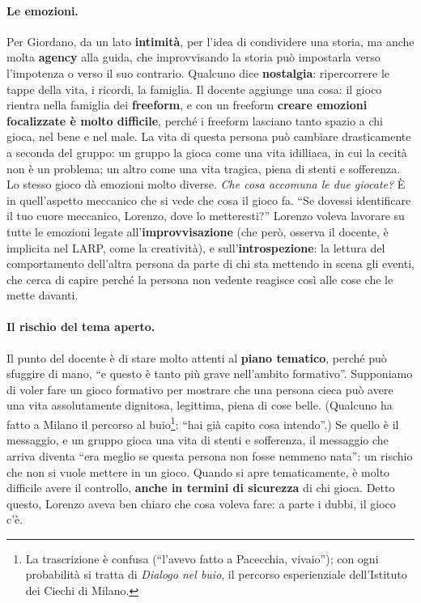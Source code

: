 \paragraph{Le emozioni.} Per Giordano, da un lato \textbf{intimità}, per l'idea di
condividere una storia, ma anche molta \textbf{agency} alla guida, che improvvisando
la storia può impostarla verso l'impotenza o verso il suo contrario. Qualcuno dice
\textbf{nostalgia}: ripercorrere le tappe della vita, i ricordi, la famiglia. Il
docente aggiunge una cosa: il gioco rientra nella famiglia dei \textbf{freeform}, e
con un freeform \textbf{creare emozioni focalizzate è molto difficile}, perché i
freeform lasciano tanto spazio a chi gioca, nel bene e nel male. La vita di questa
persona può cambiare drasticamente a seconda del gruppo: un gruppo la gioca come una
vita idilliaca, in cui la cecità non è un problema; un altro come una vita tragica,
piena di stenti e sofferenza. Lo stesso gioco dà emozioni molto diverse. \emph{Che
cosa accomuna le due giocate?} È in quell'aspetto meccanico che si vede che cosa il
gioco fa. ``Se dovessi identificare il tuo cuore meccanico, Lorenzo, dove lo
metteresti?'' Lorenzo voleva lavorare su tutte le emozioni legate
all'\textbf{improvvisazione} (che però, osserva il docente, è implicita nel LARP, come
la creatività), e sull'\textbf{introspezione}: la lettura del comportamento dell'altra
persona da parte di chi sta mettendo in scena gli eventi, che cerca di capire perché
la persona non vedente reagisce così alle cose che le mette davanti.

\paragraph{Il rischio del tema aperto.} Il punto del docente è di stare molto attenti
al \textbf{piano tematico}, perché può sfuggire di mano, ``e questo è tanto più grave
nell'ambito formativo''. Supponiamo di voler fare un gioco formativo per mostrare che
una persona cieca può avere una vita assolutamente dignitosa, legittima, piena di cose
belle. (Qualcuno ha fatto a Milano il percorso al buio\footnote{La trascrizione è
confusa (``l'avevo fatto a Pacecchia, vivaio''); con ogni probabilità si tratta di
\emph{Dialogo nel buio}, il percorso esperienziale dell'Istituto dei Ciechi di
Milano.}: ``hai già capito cosa intendo''.) Se quello è il messaggio, e un gruppo
gioca una vita di stenti e sofferenza, il messaggio che arriva diventa ``era meglio se
questa persona non fosse nemmeno nata'': un rischio che non si vuole mettere in un
gioco. Quando si apre tematicamente, è molto difficile avere il controllo, \textbf{anche
in termini di sicurezza} di chi gioca. Detto questo, Lorenzo aveva ben chiaro che cosa
voleva fare: a parte i dubbi, il gioco c'è.

